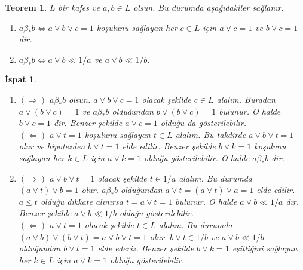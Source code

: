 \documentclass[a4paper,12pt]{article}
\numberwithin{equation}{section}
\theoremstyle{italik}
\newtheorem{teorem}{Teorem}[section]
\newtheorem*{ispat}{İspat}
\begin{document}
\begin{teorem} \label{3}
$ L $ bir kafes ve  $ a,b \in L $ olsun. Bu durumda aşağıdakiler sağlanır. 
 \begin{enumerate}[label=(\roman{*}), ref=(\roman{*})]
    \item
      $ a \beta_* b  \Leftrightarrow a \vee b \vee c = 1 $ koşulunu sağlayan her $ c \in L $ için 
      $a \vee c = 1 $ ve $ b \vee c = 1 $ dir. \label{3.1}
    \item
      $ a \beta_* b \Leftrightarrow a \vee b \ll 1/a $ ve $ a \vee b \ll 1/b $.\label{3.2}
  \end{enumerate}
\end{teorem}
\begin{ispat}
  \begin{enumerate}
    \item
      $ ( \Rightarrow ) $
      $ a \beta_* b$ olsun. $ a \vee b \vee c = 1 $ olacak şekilde $ c \in L $ alalım. Buradan $ a \vee ( b \vee c ) = 1 $ ve 
      $ a \beta_* b $ olduğundan $ b \vee ( b \vee c ) = 1 $ bulunur. O halde $ b \vee c = 1 $ dir. Benzer şekilde $ a \vee c = 1 $ olduğu da
      gösterilebilir. \\
      $( \Leftarrow )$
      $ a \vee t = 1 $ koşulunu sağlayan $ t \in L $ alalım. Bu takdirde $ a \vee b \vee t = 1 $ olur ve 
      hipotezden $ b \vee t = 1 $ elde edilir. Benzer şekilde $ b \vee k = 1 $ 
      koşulunu sağlayan her $ k \in L $ için $ a \vee k = 1 $ olduğu gösterilebilir. O halde $ a \beta_* b $ dir.
    \item
      $ ( \Rightarrow ) $
      $ a \vee b \vee t = 1 $ olacak şekilde $ t \in 1/a $ alalım. Bu durumda $ ( a \vee t ) \vee b = 1 $ olur. 
      $ a \beta_* b $ olduğundan $ a \vee t = (a \vee t) \vee a = 1 $ elde edilir. $ a \leq t $ olduğu dikkate alınırsa $ t = a \vee t = 1 $ bulunur. 
      O halde $ a \vee b \ll 1/a $ dır. Benzer şekilde $ a \vee b \ll 1/b $ olduğu gösterilebilir. \\
      $( \Leftarrow )$
      $ a \vee t = 1 $ olacak şekilde $ t \in L $ alalım. Bu durumda $ ( a \vee b ) \vee ( b \vee t ) = a \vee b \vee t = 1 $ olur. 
      $b \vee t \in 1/b $ ve $ a \vee b \ll 1/b $ olduğundan $ b \vee t = 1 $ elde ederiz. 
      Benzer şekilde $ b \vee k = 1 $ eşitliğini sağlayan her $ k \in L $ için $ a \vee k = 1 $ olduğu gösterilebilir. 
  \end{enumerate}
\end{ispat}
\end{document}
